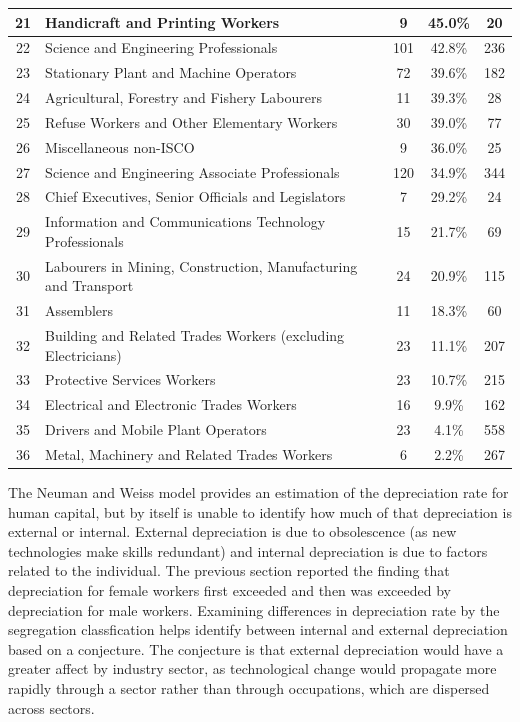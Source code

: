 \documentclass[alpha-refs]{wiley-article-02b}
\begin{document}
\begin{table}[!ht]
\begin{small}
\begin{tabular}{cp{10cm}ccc}
				21 & Handicraft and Printing Workers & 9 & 45.0\% &  20 \\ \hline
				22 & Science and Engineering Professionals & 101 & 42.8\% & 236 \\ 
				23 & Stationary Plant and Machine Operators & 72 & 39.6\% & 182 \\ 
				24 & Agricultural, Forestry and Fishery Labourers & 11 & 39.3\% &  28 \\ 
				25 & Refuse Workers and Other Elementary Workers & 30 & 39.0\% &  77 \\ 
				26 & Miscellaneous non-ISCO & 9 & 36.0\% &  25 \\ 
				27 & Science and Engineering Associate Professionals & 120 & 34.9\% & 344 \\ 
				28 & Chief Executives, Senior Officials and Legislators & 7 & 29.2\% &  24 \\ 
				29 & Information and Communications Technology Professionals & 15 & 21.7\% &  69 \\ 
				30 & Labourers in Mining, Construction, Manufacturing and Transport & 24 & 20.9\% & 115 \\ 
				31 & Assemblers & 11 & 18.3\% &  60 \\ 
				32 & Building and Related Trades Workers (excluding Electricians) & 23 & 11.1\% & 207 \\ 
				33 & Protective Services Workers & 23 & 10.7\% & 215 \\ 
				34 & Electrical and Electronic Trades Workers & 16 & 9.9\% & 162 \\ 
				35 & Drivers and Mobile Plant Operators & 23 & 4.1\% & 558 \\ 
				36 & Metal, Machinery and Related Trades Workers & 6 & 2.2\% & 267 \\ 
				\hline
			\end{tabular}
		\end{small}
	\end{table}

The Neuman and Weiss model provides an estimation of the depreciation rate for human capital, but by itself is unable to identify how much of that  depreciation is external or internal. External depreciation is due to obsolescence (as new technologies make skills redundant) and internal depreciation is due to factors related to the individual. The previous section reported the finding that depreciation for female workers first exceeded and  then was exceeded by depreciation for male workers. Examining differences in depreciation rate by the segregation classfication helps identify between internal and external depreciation based on a conjecture. The conjecture is that external depreciation would have a greater affect by industry sector, as technological change would propagate more rapidly through a sector rather than through occupations, which are dispersed across sectors. 
\end{document}
